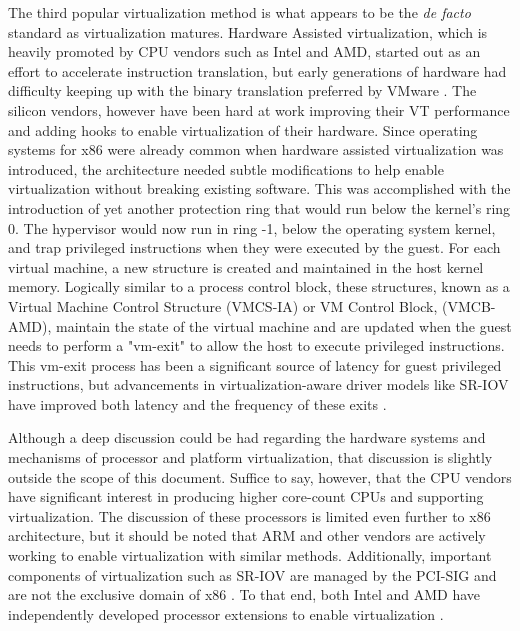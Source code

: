 The third popular virtualization method is what appears to be the \emph{de facto} standard as virtualization matures.
Hardware Assisted virtualization, which is heavily promoted by CPU vendors such as Intel and AMD, started out as an effort to accelerate instruction translation, but early generations of hardware had difficulty keeping up with the binary translation preferred by VMware \autocite{vmwareVT}.
The silicon vendors, however have been hard at work improving their VT performance and adding hooks to enable virtualization of their hardware.
Since operating systems for x86 were already common when hardware assisted virtualization was introduced, the architecture needed subtle modifications to help enable virtualization without breaking existing software.  This was accomplished with the introduction of yet another protection ring that would run below the kernel's ring 0.  
The hypervisor would now run in ring -1, below the operating system kernel, and trap privileged instructions when they were executed by the guest.
For each virtual machine, a new structure is created and maintained in the host kernel memory.  
Logically similar to a process control block, these structures, known as a Virtual Machine Control Structure (VMCS-IA) or VM Control Block, (VMCB-AMD), maintain the state of the virtual machine and are updated when the guest needs to perform a "vm-exit" to allow the host to execute privileged instructions.
This vm-exit process has been a significant source of latency for guest privileged instructions, but advancements in virtualization-aware driver models like SR-IOV have improved both latency and the frequency of these exits \autocite{_nasa_1}.

Although a deep discussion could be had regarding the hardware systems and mechanisms of processor and platform virtualization, that discussion is slightly outside the scope of this document.
Suffice to say, however, that the CPU vendors have significant interest in producing higher core-count CPUs and supporting virtualization.
The discussion of these processors is limited even further to x86 architecture, but it should be noted that ARM and other vendors are actively working to enable virtualization with similar methods.
Additionally, important components of virtualization such as SR-IOV are managed by the PCI-SIG and are not the exclusive domain of x86 \autocite{_pcisig_1}.
To that end, both Intel and AMD have independently developed processor extensions to enable virtualization \autocite{_grinberg_1}.

